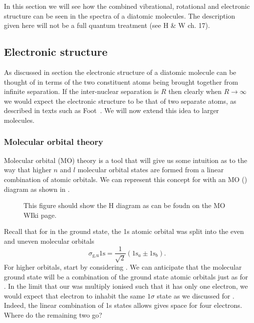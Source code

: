 
In this section we will see how the combined vibrational, rotational and
electronic structure can be seen in the spectra of a diatomic molecules. The
description given here will not be a full quantum treatment (see H \& W ch. 17).

\subsection{Electronic structure}

As discussed in section  the electronic structure of a
diatomic molecule can be thought of in terms of the two constituent atoms being
brought together from infinite separation. If the inter-nuclear separation is
$R$ then clearly when $R \to \infty$ we would expect the electronic structure to
be that of two separate atoms, as described in texts such as
Foot~\cite{Foot2005}. We will now extend this idea to larger molecules.

\subsubsection{Molecular orbital theory}


Molecular orbital (MO) theory is a tool that will give us some intuition as to
the way that higher $n$ and $l$ molecular orbital states are formed from a
linear combination of atomic orbitals. We can represent this concept for 
with an MO ()
diagram as shown in .

\begin{figure}
  \caption{This figure should show the H diagram as can be foudn on the MO
  WIki page.}
  \label{diaspec:fig:HMO}
\end{figure}

Recall that for  in the ground state, the 1s atomic orbital was split into the
even and uneven molecular orbitals
%
\begin{equation}
  \sigma_\text{g,u} 1\mathrm{s} = \frac{1}{\sqrt{2}} ( 1\mathrm{s}_a \pm
  1\mathrm{s}_b ).
\end{equation}
%
For higher orbitals, start by considering . We can anticipate that the
molecular ground state will be a combination of the ground state atomic orbitals
just as for . In the limit that our  was multiply ionised such
that it has only one electron, we would expect that electron to inhabit the same
$1\sigma$ state as we discussed for . Indeed, the linear
combination of 1s states allows gives space for four electrons. Where do the
remaining two go?

